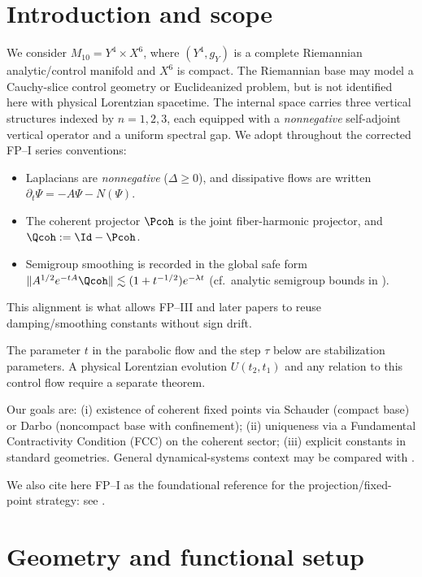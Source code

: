 \documentclass[11pt]{article}
\newcommand{\Mten}{\ensuremath{M_{10}}}
\newcommand{\Yfour}{\ensuremath{Y^{4}}}
\newcommand{\Xsix}{\ensuremath{X^{6}}}
\newcommand{\Aop}{A}
\begin{document}
\section{Introduction and scope}
We consider $\Mten=\Yfour\times\Xsix$, where $(\Yfour,g_Y)$ is a complete
Riemannian analytic/control manifold and $\Xsix$ is compact. The Riemannian base
may model a Cauchy-slice control geometry or Euclideanized problem, but is not
identified here with physical Lorentzian spacetime. The internal space carries
three vertical structures indexed by $n=1,2,3$, each equipped with a
\emph{nonnegative} self-adjoint vertical operator and a uniform spectral gap.
We adopt throughout the corrected FP--I series conventions:
\begin{itemize}
\item Laplacians are \emph{nonnegative} ($\Delta\ge 0$), and dissipative flows are written
      $\partial_t\Psi=-\Aop\Psi-N(\Psi)$.
\item The coherent projector $\Pcoh$ is the joint fiber-harmonic projector, and
      $\Qcoh:=\Id-\Pcoh$.
\item Semigroup smoothing is recorded in the global safe form
      $\|\Aop^{1/2}e^{-t\Aop}\Qcoh\|\lesssim (1+t^{-1/2})e^{-\lambda t}$
      (cf.\ analytic semigroup bounds in \cite{Amann1995,Henry1981}).
\end{itemize}
This alignment is what allows FP--III and later papers to reuse damping/smoothing
constants without sign drift.

The parameter $t$ in the parabolic flow and the step $\tau$ below are
stabilization parameters. A physical Lorentzian evolution $U(t_2,t_1)$ and any
relation to this control flow require a separate theorem.

Our goals are:
(i) existence of coherent fixed points via Schauder (compact base) or Darbo (noncompact base with confinement);
(ii) uniqueness via a Fundamental Contractivity Condition (FCC) on the coherent sector;
(iii) explicit constants in standard geometries.
General dynamical-systems context may be compared with \cite{Temam1997}.

We also cite here FP--I as the foundational reference for the projection/fixed-point strategy:
see \cite{Nero2025FP1}.

\section{Geometry and functional setup}
\end{document}
